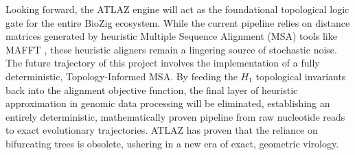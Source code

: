 Looking forward, the ATLAZ engine will act as the foundational topological logic gate for the entire BioZig ecosystem. While the current pipeline relies on distance matrices generated by heuristic Multiple Sequence Alignment (MSA) tools like MAFFT \citep{katoh2013mafft}, these heuristic aligners remain a lingering source of stochastic noise. The future trajectory of this project involves the implementation of a fully deterministic, Topology-Informed MSA. By feeding the $H_1$ topological invariants back into the alignment objective function, the final layer of heuristic approximation in genomic data processing will be eliminated, establishing an entirely deterministic, mathematically proven pipeline from raw nucleotide reads to exact evolutionary trajectories. ATLAZ has proven that the reliance on bifurcating trees is obsolete, ushering in a new era of exact, geometric virology.

